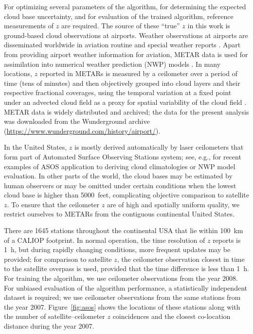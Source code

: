 \documentclass[essd,manuscript]{copernicus}
\begin{document}



For optimizing several parameters of the algorithm, for determining the expected
cloud base uncertainty, and for evaluation of the trained algorithm, reference
measurements of \ensuremath{z}{} are required.  The source of these ``true'' \ensuremath{z}{} in this work
is ground-based cloud observations at airports.  Weather observations at
airports are disseminated worldwide in aviation routine and special weather
reports \citep[METARs and SPECIs, collectively referred to as METARs
henceforth,][]{metar}.  Apart from providing airport weather information for
aviation, METAR data is used for assimilation into numerical weather prediction
(NWP) models \citep[e.g.,][]{Benjamin2016, Dee2011}.  In many locations, \ensuremath{z}{}
reported in METARs is measured by a ceilometer over a period of time (tens of
minutes) and then objectively grouped into cloud layers and their respective
fractional coverages, using the temporal variation at a fixed point under an
advected cloud field as a proxy for spatial variability of the cloud field
\citep[e.g.,][]{Heese2010}.  METAR data is widely distributed and archived; the
data for the present analysis was downloaded from the Wunderground
archive (\url{https://www.wunderground.com/history/airport/}).

In the United States, \ensuremath{z}{} is mostly derived automatically by laser ceilometers
that form part of Automated Surface Observing Stations \citep[ASOS,][]{asos}
system; see, e.g., \cite{An2017,Ikeda2017} for recent examples of ASOS
application to deriving cloud climatologies or NWP model evaluation.  In other
parts of the world, the cloud bases may be estimated by human observers or may
be omitted under certain conditions when the lowest cloud base is higher than
5000~\unit{feet}, complicating objective comparison to satellite \ensuremath{z}{}.  To ensure that
the ceilometer \ensuremath{z}{} are of high and spatially uniform quality, we restrict
ourselves to METARs from the contiguous continental United States.

There are 1645 %
stations throughout the continental USA that lie within 100~km of a CALIOP
footprint.  In normal operation, the time resolution of \ensuremath{z}{} reports is 1~h, but
during rapidly changing conditions, more frequent updates may be provided; for
comparison to satellite \ensuremath{z}{}, the ceilometer observation closest in time to the
satellite overpass is used, provided that the time difference is less than 1~h.
For training the algorithm, we use ceilometer observations from the year 2008.
For unbiased evaluation of the algorithm performance, a statistically
independent dataset is required; we use ceilometer observations from the same
stations from the year 2007.  Figure~\ref{fig:asos} shows the locations of these
stations along with the number of satellite--ceilometer \ensuremath{z}{} coincidences and the
closest co-location distance during the year 2007.
\end{document}

